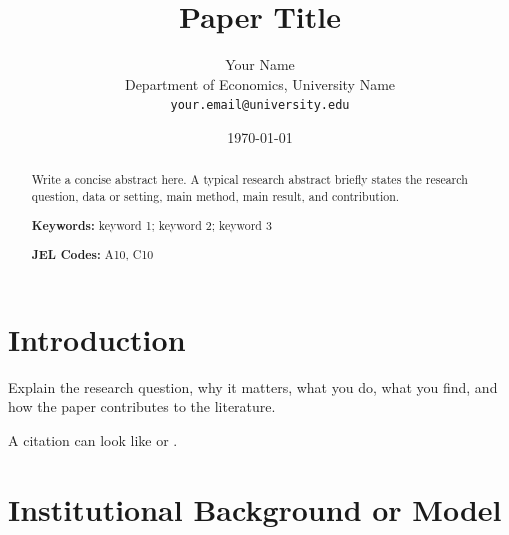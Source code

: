 \documentclass[11pt]{article}                 %
\title{Paper Title}                           %
\author{                                      %
    Your Name\\                               %
    Department of Economics, University Name\\ %
    \texttt{your.email@university.edu}        %
}
\date{\today}                                 %
\begin{document}

\maketitle                                    %

\begin{abstract}                              %
Write a concise abstract here. A typical research abstract briefly states the research question, data or setting, main method, main result, and contribution.

\vspace{0.5em}                                %

\noindent\textbf{Keywords:} keyword 1; keyword 2; keyword 3

\noindent\textbf{JEL Codes:} A10, C10

\end{abstract}                                %

\section{Introduction}\label{sec:introduction}

Explain the research question, why it matters, what you do, what you find, and how the paper contributes to the literature.

A citation can look like \citet{example2020} or \citep{example2020}.

\section{Institutional Background or Model}\label{sec:background}
\end{document}
